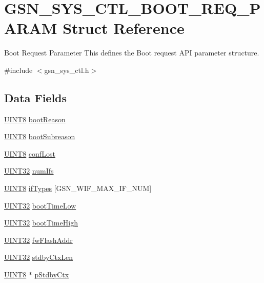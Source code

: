 \hypertarget{a00247}{
\section{GSN\_\-SYS\_\-CTL\_\-BOOT\_\-REQ\_\-PARAM Struct Reference}
\label{a00247}
}


Boot Request Parameter This defines the Boot request API parameter structure.  




{\ttfamily \#include $<$gsn\_\-sys\_\-ctl.h$>$}

\subsection*{Data Fields}
\begin{DoxyCompactItemize}
\item 
\hyperlink{a00660_gab27e9918b538ce9d8ca692479b375b6a}{UINT8} \hyperlink{a00247_a790d16551427558514773e316e68adc8}{bootReason}
\item 
\hyperlink{a00660_gab27e9918b538ce9d8ca692479b375b6a}{UINT8} \hyperlink{a00247_afd8f781bf6ef91de8ce1bdcf53047bb4}{bootSubreason}
\item 
\hyperlink{a00660_gab27e9918b538ce9d8ca692479b375b6a}{UINT8} \hyperlink{a00247_a3396d2d09670a292ab8f4d6a9e8d75fb}{confLost}
\item 
\hyperlink{a00660_gae1e6edbbc26d6fbc71a90190d0266018}{UINT32} \hyperlink{a00247_a5d8ffa77e8421c84687b597a75ed84e7}{numIfs}
\item 
\hyperlink{a00660_gab27e9918b538ce9d8ca692479b375b6a}{UINT8} \hyperlink{a00247_a9cbf66db07b0b8d7e92f702d2e6896a8}{ifTypes} \mbox{[}GSN\_\-WIF\_\-MAX\_\-IF\_\-NUM\mbox{]}
\item 
\hyperlink{a00660_gae1e6edbbc26d6fbc71a90190d0266018}{UINT32} \hyperlink{a00247_ac4320494d78b18891e3da4896e6ab01d}{bootTimeLow}
\item 
\hyperlink{a00660_gae1e6edbbc26d6fbc71a90190d0266018}{UINT32} \hyperlink{a00247_ab360fb81514af95b2c567b11bc326d72}{bootTimeHigh}
\item 
\hyperlink{a00660_gae1e6edbbc26d6fbc71a90190d0266018}{UINT32} \hyperlink{a00247_a227fcb5ac22283fc4d90e07a8363f7a5}{fwFlashAddr}
\item 
\hyperlink{a00660_gae1e6edbbc26d6fbc71a90190d0266018}{UINT32} \hyperlink{a00247_a5ef40f19e5c99b132dc4a5f1b59d9529}{stdbyCtxLen}
\item 
\hyperlink{a00660_gab27e9918b538ce9d8ca692479b375b6a}{UINT8} $\ast$ \hyperlink{a00247_a8945797439cfd2e3c2039f70561948c7}{pStdbyCtx}
\end{DoxyCompactItemize}


